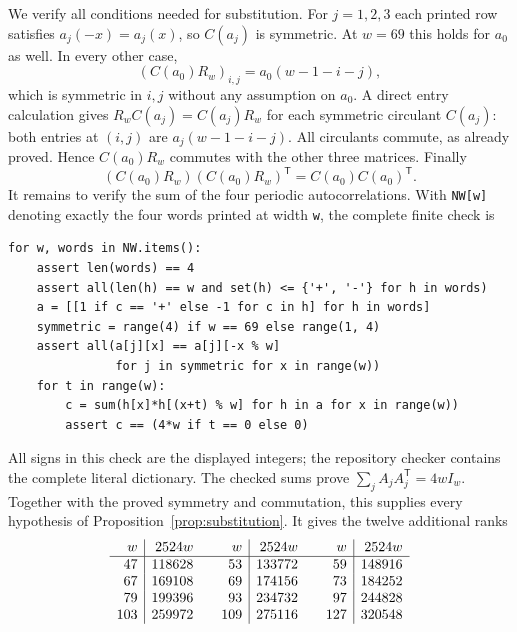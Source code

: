 \documentclass[10pt]{article}
\begin{document}
We verify all conditions needed for substitution. For $j=1,2,3$ each
printed row satisfies $a_j(-x)=a_j(x)$, so $C(a_j)$ is symmetric. At
$w=69$ this holds for $a_0$ as well. In every other case,
\[
 (C(a_0)R_w)_{i,j}=a_0(w-1-i-j),
\]
which is symmetric in $i,j$ without any assumption on $a_0$. A direct
entry calculation gives $R_wC(a_j)=C(a_j)R_w$ for each symmetric
circulant $C(a_j)$: both entries at $(i,j)$ are
$a_j(w-1-i-j)$. All circulants commute, as already proved. Hence
$C(a_0)R_w$ commutes with the other three matrices. Finally
\[
 (C(a_0)R_w)(C(a_0)R_w)^{\mathsf T}=C(a_0)C(a_0)^{\mathsf T}.
\]
It remains to verify the sum of the four periodic autocorrelations. With
\texttt{NW[w]} denoting exactly the four words printed at width
\texttt{w}, the complete finite check is
\begin{verbatim}
for w, words in NW.items():
    assert len(words) == 4
    assert all(len(h) == w and set(h) <= {'+', '-'} for h in words)
    a = [[1 if c == '+' else -1 for c in h] for h in words]
    symmetric = range(4) if w == 69 else range(1, 4)
    assert all(a[j][x] == a[j][-x % w]
               for j in symmetric for x in range(w))
    for t in range(w):
        c = sum(h[x]*h[(x+t) % w] for h in a for x in range(w))
        assert c == (4*w if t == 0 else 0)
\end{verbatim}
All signs in this check are the displayed integers; the repository checker
contains the complete literal dictionary. The checked sums prove
$\sum_jA_jA_j^{\mathsf T}=4wI_w$. Together with the proved symmetry and
commutation, this supplies every hypothesis of
Proposition~\ref{prop:substitution}. It gives the twelve additional ranks
\[
\begin{array}{r|r@{\qquad}r|r@{\qquad}r|r}
w&2524w&w&2524w&w&2524w\\\hline
47&118628&53&133772&59&148916\\
67&169108&69&174156&73&184252\\
79&199396&93&234732&97&244828\\
103&259972&109&275116&127&320548\\
\end{array}
\]
\end{document}
